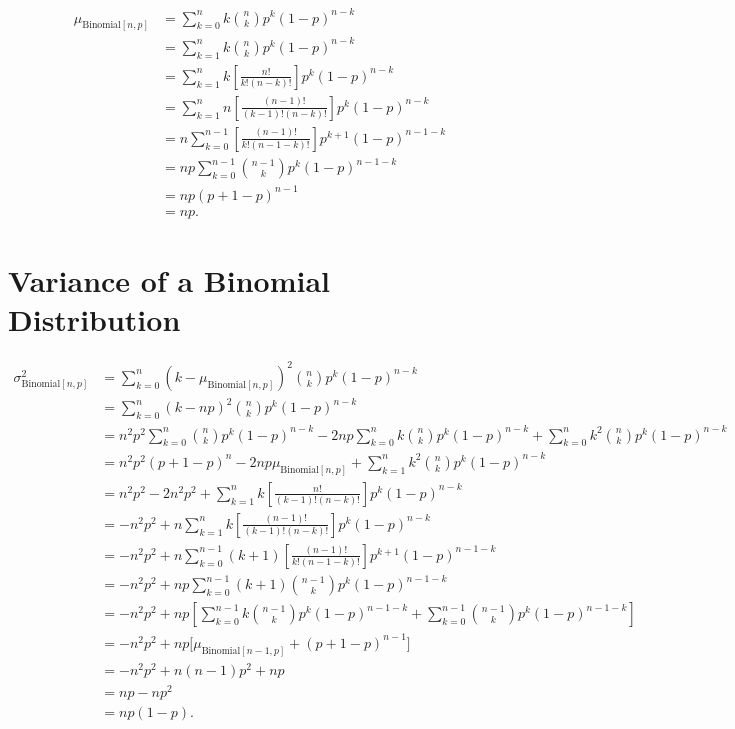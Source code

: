\documentclass{myart}
\newcommand{\mean}{\mu}
\newcommand{\variance}{\sigma^2}
\newcommand{\sub}[1]{_{\text{#1}}}
\begin{document}
\begin{align*}
   \mean\sub{Binomial$[n,p]$}
&= \sum_{k=0}^n k \binom{n}{k} p^k (1-p)^{n-k} \\
&= \sum_{k=1}^n k \binom{n}{k} p^k (1-p)^{n-k} \\
&= \sum_{k=1}^n k \left[\frac{n!}{k!(n-k)!}\right] p^k (1-p)^{n-k} \\
&= \sum_{k=1}^n n \left[\frac{(n-1)!}{(k-1)!(n-k)!}\right]
     p^k (1-p)^{n-k} \\
&= n \sum_{k=0}^{n-1} \left[\frac{(n-1)!}{k!(n-1-k)!}\right]
     p^{k+1} (1-p)^{n-1-k} \\
&= n p \sum_{k=0}^{n-1} \binom{n-1}{k} p^k (1-p)^{n-1-k} \\
&= n p (p + 1 - p)^{n-1} \\
&= n p.
\end{align*}

\section{Variance of a Binomial Distribution}

\begin{align*}
   \variance\sub{Binomial$[n,p]$}
&= \sum_{k=0}^n (k - \mean\sub{Binomial$[n,p]$})^2
     \binom{n}{k} p^k (1-p)^{n-k} \\
&= \sum_{k=0}^n (k - n p)^2 \binom{n}{k} p^k (1-p)^{n-k} \\
&= n^2 p^2 \sum_{k=0}^n
       \binom{n}{k} p^k (1-p)^{n-k}
     - 2n p \sum_{k=0}^n k \binom{n}{k} p^k (1-p)^{n-k}
     + \sum_{k=0}^n k^2 \binom{n}{k} p^k (1-p)^{n-k} \\
&= n^2 p^2 (p + 1 - p)^n - 2n p \mean\sub{Binomial$[n,p]$}
   + \sum_{k=1}^n k^2 \binom{n}{k} p^k (1-p)^{n-k} \\
&= n^2 p^2 - 2n^2 p^2 + \sum_{k=1}^n k \left[
     \frac{n!}{(k-1)!(n-k)!}
   \right] p^k (1-p)^{n-k} \\
&= -n^2 p^2 + n \sum_{k=1}^n k \left[
     \frac{(n-1)!}{(k-1)! (n-k)!}
   \right] p^k (1-p)^{n-k} \\
&= -n^2 p^2 + n \sum_{k=0}^{n-1} (k+1) \left[
     \frac{(n-1)!}{k! (n-1-k)!}
   \right] p^{k+1} (1-p)^{n-1-k} \\
&= -n^2 p^2 + n p \sum_{k=0}^{n-1}
     (k+1) \binom{n-1}{k} p^k (1-p)^{n-1-k} \\
&= - n^2 p^2
   + n p \left[\sum_{k=0}^{n-1} k \binom{n-1}{k} p^k (1-p)^{n-1-k}
   + \sum_{k=0}^{n-1} \binom{n-1}{k} p^k (1-p)^{n-1-k}\right] \\
&= - n^2 p^2 + n p \big[\mean\sub{Binomial$[n-1,p]$}
   + (p + 1 - p)^{n-1}\big] \\
&= -n^2 p^2 + n(n - 1) p^2 + n p \\
&= n p - n p^2 \\
&= n p (1 - p).
\end{align*}
\end{document}
